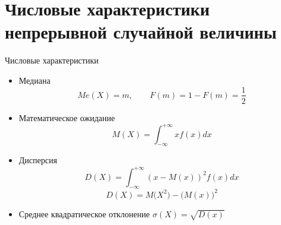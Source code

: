 \documentclass[unicode,11pt,notheorems,xcolor=table]{beamer}
\begin{document}
\section{Числовые характеристики непрерывной случайной величины}

\begin{frame}{Числовые характеристики}{}
    \begin{itemize}
        \item Медиана
        $$
            Me(X)=m, \qquad F(m)=1-F(m)=\frac{1}{2}
        $$
        \item Математическое ожидание
        $$
            M(X)= \int_{-\infty}^{+\infty} xf(x)dx
        $$
        \item Дисперсия
        $$
            D(X)= \int_{-\infty}^{+\infty} (x-M(x))^2 f(x)dx
        $$
        $$
            D(X)= M\big(X^2\big)-\big( M(x) \big)^2
        $$
        \item Среднее квадратическое отклонение
        $\sigma(X) =\sqrt{D(x)}$
    \end{itemize}
\end{frame}
\end{document}
